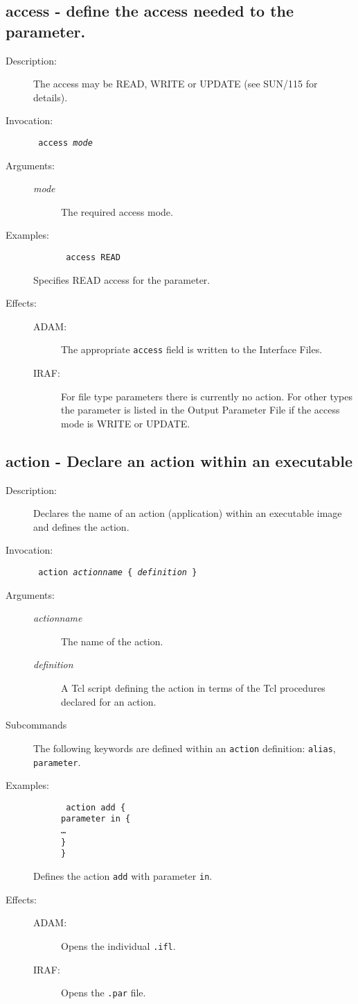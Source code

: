 \documentclass[twoside,11pt]{article}
\newcommand{\htmlref}[2]{#1}
\newcommand{\xref}[3]{#1}
\newcommand{\xlabel}[1]{}
\newcommand{\tab}{\>}
\renewcommand{\tab}{   }
\newlength{\sstbannerlength}
\newlength{\sstcaptionlength}
\newlength{\sstexampleslength}
\newlength{\sstexampleswidth}
\newcommand{\sstroutine}[3]{
   \goodbreak
   \rule{\textwidth}{0.5mm}
   \vspace{-7ex}
   \newline
   \settowidth{\sstbannerlength}{{\Large {\bf #1}}}
   \setlength{\sstcaptionlength}{\textwidth}
   \setlength{\sstexampleslength}{\textwidth}
   \addtolength{\sstbannerlength}{0.5em}
   \addtolength{\sstcaptionlength}{-2.0\sstbannerlength}
   \addtolength{\sstcaptionlength}{-5.0pt}
   \settowidth{\sstexampleswidth}{{\bf Examples:}}
   \addtolength{\sstexampleslength}{-\sstexampleswidth}
   \parbox[t]{\sstbannerlength}{\flushleft{\Large {\bf #1}}}
   \parbox[t]{\sstcaptionlength}{\center{\Large #2}}
   \parbox[t]{\sstbannerlength}{\flushright{\Large {\bf #1}}}
   \begin{description}
      #3
   \end{description}
}
\newcommand{\sstdescription}[1]{\item[Description:] #1}
\newcommand{\sstinvocation}[1]{\item[Invocation:]\hspace{0.4em}{\tt #1}}
\newcommand{\ssteffects}[1]{
   \item[Effects:] \mbox{} \\
   \vspace{-3.5ex}
   \begin{description}
      #1
   \end{description}
}
\newcommand{\sstarguments}[1]{
   \item[Arguments:] \mbox{} \\
   \vspace{-3.5ex}
   \begin{description}
      #1
   \end{description}
}
\newcommand{\sstexamples}[1]{
   \item[Examples:] \mbox{}
      #1
}
\newcommand{\sstsubsection}[1]{ \item[{#1}] \mbox{} \\}
\newcommand{\sstexamplesubsection}[2]
{   \vspace{-5ex}
\begin{quote} \texttt{\begin{tabbing}
xxx\=xxx\=\kill
#1
\end{tabbing}}
\end{quote}
#2}
\newcommand{\sstdiytopic}[2]{\item[{\hspace{-0.35em}#1\hspace{-0.35em}:}] \mbox{} \\[1.3ex] #2}
\newcommand{\ssttt}{\tt}
\renewcommand{\sstroutine}[3]{
      \subsection{#1\xlabel{#1}-\label{#1}#2}
      \begin{description}
         #3
      \end{description}
   }
\renewcommand{\sstdescription}[1]{\item[Description:]
      \begin{description}
         #1
      \end{description}
   }
\renewcommand{\sstinvocation}[1]{\item[Invocation:]
      \begin{description}
         {\ssttt #1}
      \end{description}
   }
\renewcommand{\ssteffects}[1]{
      \item[Effects:]
      \begin{description}
         #1
      \end{description}
   }
\renewcommand{\sstarguments}[1]{
      \item[Arguments:]
      \begin{description}
         #1
      \end{description}
   }
\renewcommand{\sstexamples}[1]{
      \item[Examples:]
      \begin{description}
         #1
      \end{description}
   }
\renewcommand{\sstsubsection}[1]{\item[{#1}]}
\renewcommand{\sstexamplesubsection}[2]{\item[] {\ssttt #1} \\ \item[#2]}
\renewcommand{\sstdiytopic}[2]{\item[{#1}]
      \begin{description}
         #2
      \end{description}
   }
\begin{document}
\sstroutine{
   access
}{
   define the access needed to the parameter.
}{
   \sstdescription{
      The access may be READ, WRITE or UPDATE (see 
      \xref{SUN/115}{sun115}{}
      for details).
   }
   \sstinvocation{
      access \textit{mode}
   }
   \sstarguments{
      \sstsubsection{
         \textit{mode}
      }{
         The required access mode.
      }
   }
   \sstexamples{
      \sstexamplesubsection{
         access READ
      }{
         Specifies READ access for the parameter.
      }
   }
   \ssteffects{
      \sstsubsection{ADAM:}
         {The appropriate {\ssttt access} field is written to the Interface 
          Files.}
      \sstsubsection{IRAF:}
         {For file type parameters there is currently no action. For other
          types the parameter is listed in the Output Parameter File if the
          access mode is WRITE or UPDATE.}
   }
}

\sstroutine{
   action
}{
   Declare an action within an executable
}{
   \sstdescription{
      Declares the name of an action (application) within an executable 
      image and defines the action.
   }
   \sstinvocation{
      action \textit{actionname} \{ \textit{definition} \}
   }
   \sstarguments{
      \sstsubsection{
         \textit{actionname}
      }{
         The name of the action.
      }
      \sstsubsection{
         \textit{definition}
      }{
         A Tcl script defining the action in terms of the Tcl procedures
         declared for an action.
      }         
   }
   \sstdiytopic{Subcommands}{
      The following keywords are defined within an \texttt{action} definition:
      \htmlref{{\ssttt alias}}{alias},
      \htmlref{{\ssttt parameter}}{parameter}.
   }
   \sstexamples{
      \sstexamplesubsection{
         action add \{\\
         \tab parameter in \{\\
         \tab \tab \dots\\
         \tab \}\\
         \}
      }{
         Defines the action {\ssttt add} with parameter {\ssttt in}.
      }
   }
   \ssteffects{
      \sstsubsection{ADAM:}{Opens the individual \texttt{.ifl}.}
      \sstsubsection{IRAF:}{Opens the \texttt{.par} file.}
   }
}
\end{document}
